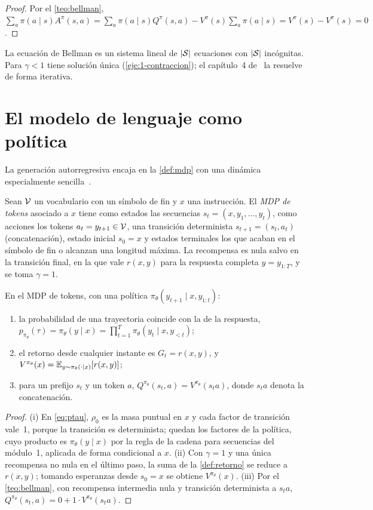 \begin{proof}
Por el \cref{teo:bellman}, $\sum_a\pi(a\mid s)A^{\pi}(s,a)=\sum_a\pi(a\mid s)Q^{\pi}(s,a)-V^{\pi}(s)\sum_a\pi(a\mid s)=V^{\pi}(s)-V^{\pi}(s)=0$.
\end{proof}

La ecuación de Bellman es un sistema lineal de $\lvert\mathcal{S}\rvert$ ecuaciones con $\lvert\mathcal{S}\rvert$ incógnitas. Para $\gamma<1$ tiene solución única (\cref{eje:1-contraccion}); el capítulo~4 de~\cite{sb} la resuelve de forma iterativa.

\section{El modelo de lenguaje como política}

La generación autorregresiva encaja en la \cref{def:mdp} con una dinámica especialmente sencilla~\cite{cs336}.

\begin{definicion}\label{def:mdp-tokens}
Sean $\mathcal{V}$ un vocabulario con un símbolo de fin y $x$ una instrucción. El \emph{MDP de tokens} asociado a $x$ tiene como estados las secuencias $s_t=(x,y_1,\dots,y_t)$, como acciones los tokens $a_t=y_{t+1}\in\mathcal{V}$, una transición determinista $s_{t+1}=(s_t,a_t)$ (concatenación), estado inicial $s_0=x$ y estados terminales los que acaban en el símbolo de fin o alcanzan una longitud máxima. La recompensa es nula salvo en la transición final, en la que vale $r(x,y)$ para la respuesta completa $y=y_{1:T}$, y se toma $\gamma=1$.
\end{definicion}

\begin{proposicion}\label{prop:mdp-tokens}
En el MDP de tokens, con una política $\pi_\theta(y_{t+1}\mid x,y_{1:t})$:
\begin{enumerate}
  \item la probabilidad de una trayectoria coincide con la de la respuesta, $p_{\pi_\theta}(\tau)=\pi_\theta(y\mid x)=\prod_{t=1}^{T}\pi_\theta(y_t\mid x,y_{<t})$;
  \item el retorno desde cualquier instante es $G_t=r(x,y)$, y $V^{\pi_\theta}(x)=\mathbb{E}_{y\sim\pi_\theta(\cdot\mid x)}[r(x,y)]$;
  \item para un prefijo $s_t$ y un token $a$, $Q^{\pi_\theta}(s_t,a)=V^{\pi_\theta}(s_t a)$, donde $s_t a$ denota la concatenación.
\end{enumerate}
\end{proposicion}

\begin{proof}
(i) En \eqref{eq:ptau}, $\rho_0$ es la masa puntual en $x$ y cada factor de transición vale~1, porque la transición es determinista; quedan los factores de la política, cuyo producto es $\pi_\theta(y\mid x)$ por la regla de la cadena para secuencias del módulo~1, aplicada de forma condicional a $x$. (ii) Con $\gamma=1$ y una única recompensa no nula en el último paso, la suma de la \cref{def:retorno} se reduce a $r(x,y)$; tomando esperanzas desde $s_0=x$ se obtiene $V^{\pi_\theta}(x)$. (iii) Por el \cref{teo:bellman}, con recompensa intermedia nula y transición determinista a $s_ta$, $Q^{\pi_\theta}(s_t,a)=0+1\cdot V^{\pi_\theta}(s_ta)$.
\end{proof}

